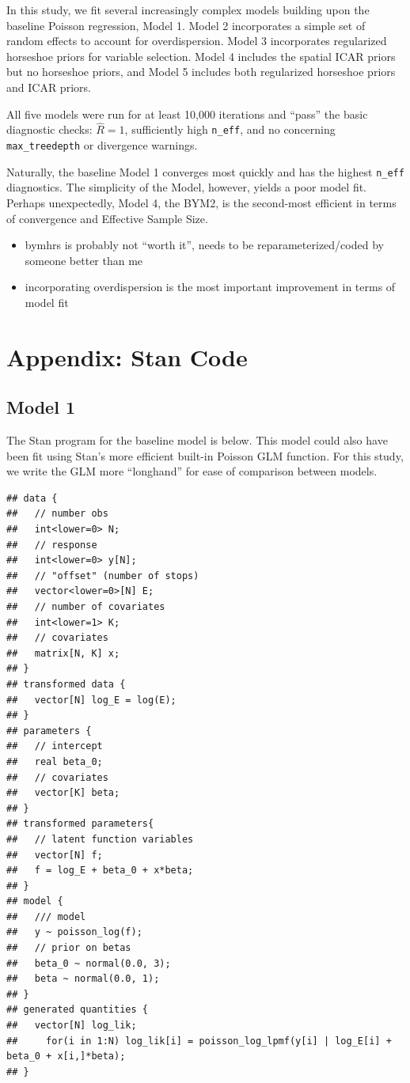 \documentclass[]{article}
\providecommand{\tightlist}{%
  \setlength{\itemsep}{0pt}\setlength{\parskip}{0pt}}
\begin{document}
In this study, we fit several increasingly complex models building upon
the baseline Poisson regression, Model 1. Model 2 incorporates a simple
set of random effects to account for overdispersion. Model 3
incorporates regularized horseshoe priors for variable selection. Model
4 includes the spatial ICAR priors but no horseshoe priors, and Model 5
includes both regularized horseshoe priors and ICAR priors.

All five models were run for at least 10,000 iterations and ``pass'' the
basic diagnostic checks: \(\hat{R} = 1\), sufficiently high
\texttt{n\_eff}, and no concerning \texttt{max\_treedepth} or divergence
warnings.

Naturally, the baseline Model 1 converges most quickly and has the
highest \texttt{n\_eff} diagnostics. The simplicity of the Model,
however, yields a poor model fit. Perhaps unexpectedly, Model 4, the
BYM2, is the second-most efficient in terms of convergence and Effective
Sample Size.

\begin{itemize}
\tightlist
\item
  bymhrs is probably not ``worth it'', needs to be reparameterized/coded
  by someone better than me
\item
  incorporating overdispersion is the most important improvement in
  terms of model fit
\end{itemize}

\section{Appendix: Stan Code}\label{appendix-stan-code}

\subsection{Model 1}\label{model-1-1}

The Stan program for the baseline model is below. This model could also
have been fit using Stan's more efficient built-in Poisson GLM function.
For this study, we write the GLM more ``longhand'' for ease of
comparison between models.

\begin{verbatim}
## data {
##   // number obs
##   int<lower=0> N;
##   // response
##   int<lower=0> y[N];       
##   // "offset" (number of stops)
##   vector<lower=0>[N] E;     
##   // number of covariates
##   int<lower=1> K;
##   // covariates
##   matrix[N, K] x;
## }
## transformed data {
##   vector[N] log_E = log(E);
## }
## parameters {
##   // intercept
##   real beta_0;      
##   // covariates
##   vector[K] beta;          
## }
## transformed parameters{
##   // latent function variables
##   vector[N] f;
##   f = log_E + beta_0 + x*beta;
## }
## model {
##   /// model 
##   y ~ poisson_log(f); 
##   // prior on betas
##   beta_0 ~ normal(0.0, 3);
##   beta ~ normal(0.0, 1);
## }
## generated quantities {
##   vector[N] log_lik; 
##     for(i in 1:N) log_lik[i] = poisson_log_lpmf(y[i] | log_E[i] + beta_0 + x[i,]*beta);
## }
\end{verbatim}
\end{document}
